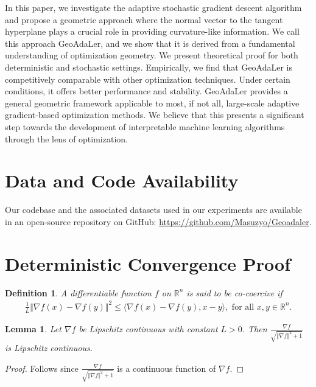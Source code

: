 \documentclass{article}
\newtheorem{lemma}{Lemma}
\newtheorem{definition}{Definition}
\begin{document}
In this paper, we investigate the adaptive stochastic gradient descent algorithm and propose a geometric approach where the normal vector to the tangent hyperplane plays a crucial role in providing curvature-like information. We call this approach GeoAdaLer, and we show that it is derived from a fundamental understanding of optimization geometry. We present theoretical proof for both deterministic and stochastic settings.
Empirically, we find that GeoAdaLer is competitively comparable with other optimization techniques. Under certain conditions, it offers better performance and stability. GeoAdaLer provides a general geometric framework applicable to most, if not all, large-scale adaptive gradient-based optimization methods. We believe that this presents a significant step towards the development of interpretable machine learning algorithms through the lens of optimization.

\section*{Data and Code Availability}
Our codebase and the associated datasets used in our experiments are available in an open-source repository on GitHub: \hyperlink{https://github.com/Masuzyo/Geoadaler}{https://github.com/Masuzyo/Geoadaler}.

\vskip 0.2in




\newpage
\appendix
\section{Deterministic Convergence Proof}\label{proof-deterministic}
\begin{definition}
A differentiable function $f$ on $\mathbb{R}^n$ is said to be co-coercive if 
\begin{align}
\frac{1 }{L}\Vert\nabla f(x)-\nabla f(y) \Vert^2\leq \langle \nabla f(x)-\nabla f (y),x-y\rangle, \text { for all } x,y \in \mathbb R^n.
\end{align}
\end{definition}

\begin{lemma}
Let $\nabla f$ be Lipschitz continuous with constant $L>0$. Then $\frac{\nabla f}{\sqrt{\Vert \nabla f \Vert^2 + 1}}$ is Lipschitz continuous.
\end{lemma}
\begin{proof}
    Follows since $\frac{\nabla f}{\sqrt{\Vert \nabla f \Vert^2 + 1}}$ is a continuous function of $\nabla f$.
\end{proof}
\end{document}
